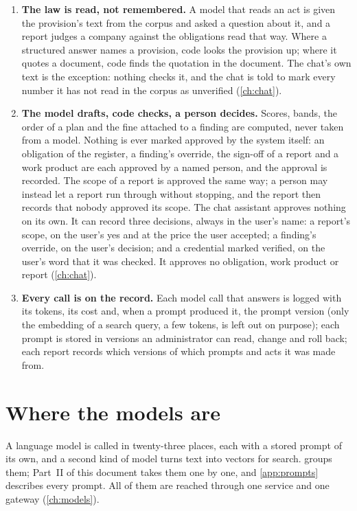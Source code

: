 \begin{enumerate}
  \item \textbf{The law is read, not remembered.} A model that reads an act is given the
    provision's text from the corpus and asked a question about it, and a report judges a
    company against the obligations read that way. Where a structured answer names a
    provision, code looks the provision up; where it quotes a document, code finds the
    quotation in the document. The chat's own text is the exception: nothing checks it, and
    the chat is told to mark every number it has not read in the corpus as unverified
    (\cref{ch:chat}).
  \item \textbf{The model drafts, code checks, a person decides.} Scores, bands, the order of a plan and
    the fine attached to a finding are computed, never taken from a model. Nothing is ever
    marked approved by the system itself: an obligation of the register, a finding's override,
    the sign-off of a report and a work product are each approved by a named person, and the
    approval is recorded. The scope of a report is approved the same way; a person may instead
    let a report run through without stopping, and the report then records that nobody
    approved its scope. The chat assistant approves nothing on its own. It can record three
    decisions, always in the user's name: a report's scope, on the user's yes and at the
    price the user accepted; a finding's override, on the user's decision; and a credential
    marked verified, on the user's word that it was checked. It approves no obligation, work
    product or report (\cref{ch:chat}).
  \item \textbf{Every call is on the record.} Each model call that answers is logged with its
    tokens, its cost and, when a prompt produced it, the prompt version (only the embedding of
    a search query, a few tokens, is left out on purpose); each prompt is stored in versions an
    administrator can read, change and roll back; each report records which versions of which
    prompts and acts it was made from.
\end{enumerate}

\section{Where the models are}\label{sec:intro:models}

A language model is called in twenty-three places, each with a stored prompt of its own, and a
second kind of model turns text into vectors for search.  groups them;
Part~II of this document takes them one by one, and \cref{app:prompts} describes every prompt.
All of them are reached through one service and one gateway (\cref{ch:models}).

